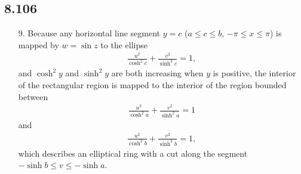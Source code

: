 \documentclass[a4paper,12pt]{article}
\begin{document}
\subsection*{8.106}
\begin{enumerate}
    \item[9.]
        Because any horizontal line segment $y = c$ ($a \leq c \leq b$, $-\pi \leq x \leq \pi$) is mapped by $w = \sin z$ to the ellipse
        \begin{align*}
            \frac{u^2}{\cosh^2 c} + \frac{v^2}{\sinh^2 c} = 1,
        \end{align*}
        and $\cosh^2 y$ and $\sinh^2 y$ are both increasing when $y$ is positive, the interior of the rectangular region is mapped to the interior of the region bounded between
        \begin{align*}
            \frac{u^2}{\cosh^2 a} + \frac{v^2}{\sinh^2 a} = 1
        \end{align*}
        and
        \begin{align*}
            \frac{u^2}{\cosh^2 b} + \frac{v^2}{\sinh^2 b} = 1,
        \end{align*}
        which describes an elliptical ring with a cut along the segment $-\sinh b \leq v \leq -\sinh a$.
\end{enumerate}
\end{document}
